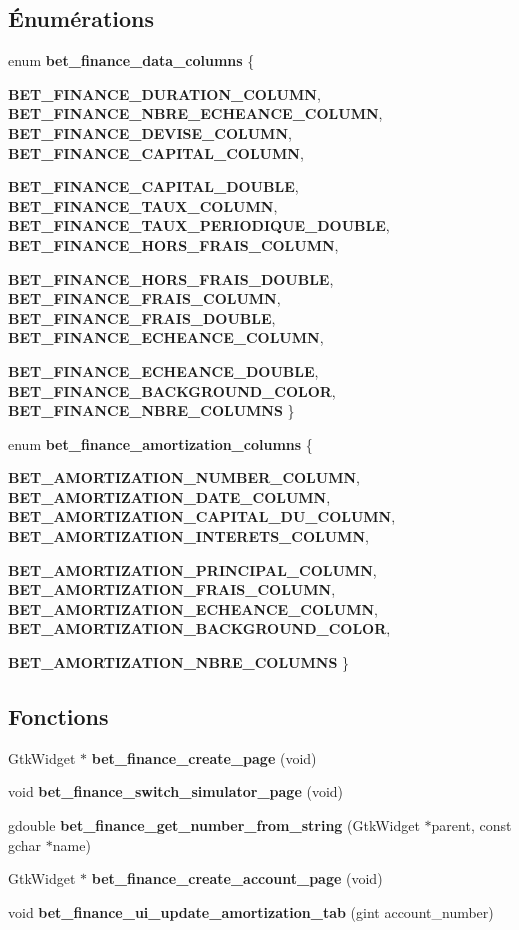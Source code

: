 \subsection*{Énumérations}
\begin{DoxyCompactItemize}
\item 
enum {\bf bet\_\-finance\_\-data\_\-columns} \{ \par
{\bf BET\_\-FINANCE\_\-DURATION\_\-COLUMN}, 
{\bf BET\_\-FINANCE\_\-NBRE\_\-ECHEANCE\_\-COLUMN}, 
{\bf BET\_\-FINANCE\_\-DEVISE\_\-COLUMN}, 
{\bf BET\_\-FINANCE\_\-CAPITAL\_\-COLUMN}, 
\par
{\bf BET\_\-FINANCE\_\-CAPITAL\_\-DOUBLE}, 
{\bf BET\_\-FINANCE\_\-TAUX\_\-COLUMN}, 
{\bf BET\_\-FINANCE\_\-TAUX\_\-PERIODIQUE\_\-DOUBLE}, 
{\bf BET\_\-FINANCE\_\-HORS\_\-FRAIS\_\-COLUMN}, 
\par
{\bf BET\_\-FINANCE\_\-HORS\_\-FRAIS\_\-DOUBLE}, 
{\bf BET\_\-FINANCE\_\-FRAIS\_\-COLUMN}, 
{\bf BET\_\-FINANCE\_\-FRAIS\_\-DOUBLE}, 
{\bf BET\_\-FINANCE\_\-ECHEANCE\_\-COLUMN}, 
\par
{\bf BET\_\-FINANCE\_\-ECHEANCE\_\-DOUBLE}, 
{\bf BET\_\-FINANCE\_\-BACKGROUND\_\-COLOR}, 
{\bf BET\_\-FINANCE\_\-NBRE\_\-COLUMNS}
 \}
\item 
enum {\bf bet\_\-finance\_\-amortization\_\-columns} \{ \par
{\bf BET\_\-AMORTIZATION\_\-NUMBER\_\-COLUMN}, 
{\bf BET\_\-AMORTIZATION\_\-DATE\_\-COLUMN}, 
{\bf BET\_\-AMORTIZATION\_\-CAPITAL\_\-DU\_\-COLUMN}, 
{\bf BET\_\-AMORTIZATION\_\-INTERETS\_\-COLUMN}, 
\par
{\bf BET\_\-AMORTIZATION\_\-PRINCIPAL\_\-COLUMN}, 
{\bf BET\_\-AMORTIZATION\_\-FRAIS\_\-COLUMN}, 
{\bf BET\_\-AMORTIZATION\_\-ECHEANCE\_\-COLUMN}, 
{\bf BET\_\-AMORTIZATION\_\-BACKGROUND\_\-COLOR}, 
\par
{\bf BET\_\-AMORTIZATION\_\-NBRE\_\-COLUMNS}
 \}
\end{DoxyCompactItemize}
\subsection*{Fonctions}
\begin{DoxyCompactItemize}
\item 
GtkWidget $\ast$ {\bf bet\_\-finance\_\-create\_\-page} (void)
\item 
void {\bf bet\_\-finance\_\-switch\_\-simulator\_\-page} (void)
\item 
gdouble {\bf bet\_\-finance\_\-get\_\-number\_\-from\_\-string} (GtkWidget $\ast$parent, const gchar $\ast$name)
\item 
GtkWidget $\ast$ {\bf bet\_\-finance\_\-create\_\-account\_\-page} (void)
\item 
void {\bf bet\_\-finance\_\-ui\_\-update\_\-amortization\_\-tab} (gint account\_\-number)
\end{DoxyCompactItemize}
